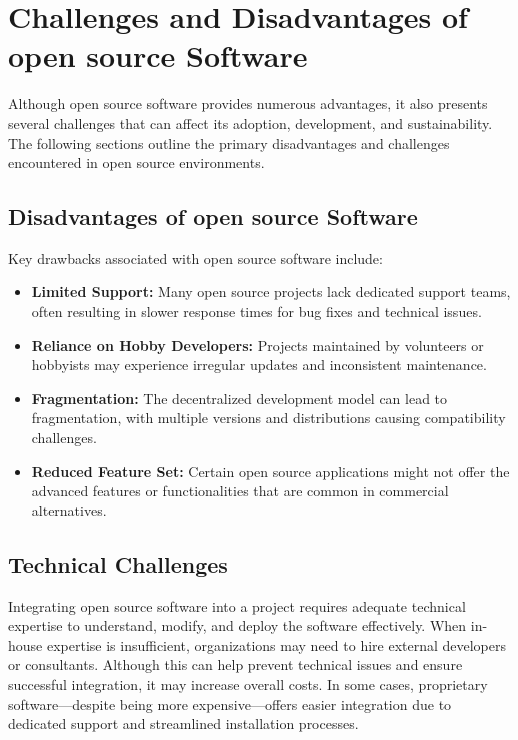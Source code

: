 \cite{forbes_misconceptions_open_source_2024}

\section{Challenges and Disadvantages of open source Software}

Although open source software provides numerous advantages, it also presents several challenges that can affect its adoption, development, and sustainability. The following sections outline the primary disadvantages and challenges encountered in open source environments.

\subsection{Disadvantages of open source Software}

Key drawbacks associated with open source software include:

\begin{itemize}
    \item \textbf{Limited Support:} Many open source projects lack dedicated support teams, often resulting in slower response times for bug fixes and technical issues.
    \item \textbf{Reliance on Hobby Developers:} Projects maintained by volunteers or hobbyists may experience irregular updates and inconsistent maintenance.
    \item \textbf{Fragmentation:} The decentralized development model can lead to fragmentation, with multiple versions and distributions causing compatibility challenges.
    \item \textbf{Reduced Feature Set:} Certain open source applications might not offer the advanced features or functionalities that are common in commercial alternatives.
\end{itemize}

\cite{OpenSource-Software-Risks-Disadvantages}

\subsection{Technical Challenges}

Integrating open source software into a project requires adequate technical expertise to understand, modify, and deploy the software effectively. When in-house expertise is insufficient, organizations may need to hire external developers or consultants. Although this can help prevent technical issues and ensure successful integration, it may increase overall costs. In some cases, proprietary software—despite being more expensive—offers easier integration due to dedicated support and streamlined installation processes.

